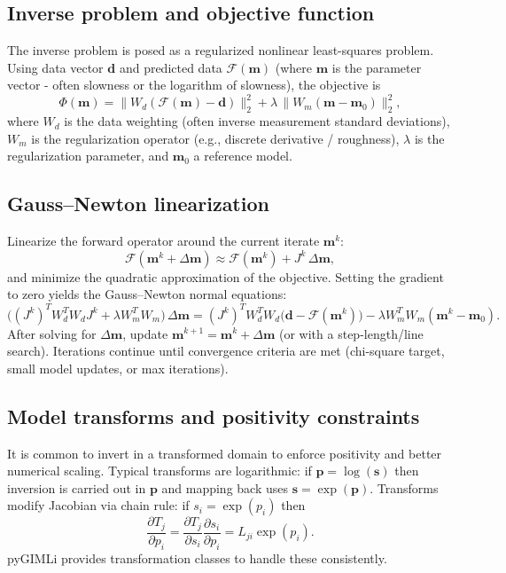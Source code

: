 \subsection*{Inverse problem and objective function}
The inverse problem is posed as a regularized nonlinear least-squares problem. Using data vector $\mathbf{d}$ and predicted data $\mathcal{F}(\mathbf{m})$ (where $\mathbf{m}$ is the parameter vector - often slowness or the logarithm of slowness), the objective is
\begin{equation}\label{eq:objective}
\Phi(\mathbf{m}) = \|W_d(\mathcal{F}(\mathbf{m}) - \mathbf{d})\|_2^2 + \lambda\, \|W_m(\mathbf{m}-\mathbf{m}_0)\|_2^2,
\end{equation}
where $W_d$ is the data weighting (often inverse measurement standard deviations), $W_m$ is the regularization operator (e.g., discrete derivative / roughness), $\lambda$ is the regularization parameter, and $\mathbf{m}_0$ a reference model.

\subsection*{Gauss--Newton linearization}
Linearize the forward operator around the current iterate $\mathbf{m}^k$:
\begin{equation}
\mathcal{F}(\mathbf{m}^k+\Delta\mathbf{m}) \approx \mathcal{F}(\mathbf{m}^k) + J^k\,\Delta\mathbf{m},
\end{equation}
and minimize the quadratic approximation of the objective. Setting the gradient to zero yields the Gauss--Newton normal equations:
\begin{equation}\label{eq:gn}
\big((J^k)^T W_d^T W_d J^k + \lambda W_m^T W_m\big)\,\Delta\mathbf{m} = (J^k)^T W_d^T W_d\big(\mathbf{d}-\mathcal{F}(\mathbf{m}^k)\big) - \lambda W_m^T W_m(\mathbf{m}^k-\mathbf{m}_0).
\end{equation}
After solving for $\Delta\mathbf{m}$, update $\mathbf{m}^{k+1}=\mathbf{m}^k+\Delta\mathbf{m}$ (or with a step-length/line search). Iterations continue until convergence criteria are met (chi-square target, small model updates, or max iterations).

\subsection*{Model transforms and positivity constraints}
It is common to invert in a transformed domain to enforce positivity and better numerical scaling. Typical transforms are logarithmic: if $\mathbf{p}=\log(\mathbf{s})$ then inversion is carried out in $\mathbf{p}$ and mapping back uses $\mathbf{s}=\exp(\mathbf{p})$. Transforms modify Jacobian via chain rule: if $s_i=\exp(p_i)$ then
\[ \frac{\partial T_j}{\partial p_i} = \frac{\partial T_j}{\partial s_i} \frac{\partial s_i}{\partial p_i} = L_{ji} \exp(p_i).
\]
pyGIMLi \cite{Ruecker2017} provides transformation classes to handle these consistently.

